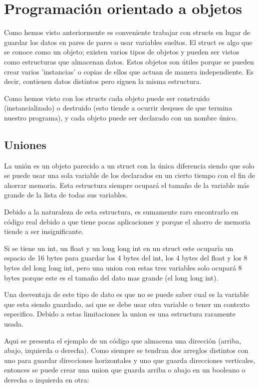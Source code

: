 \documentclass{article}
\begin{document}
\section{Programación orientado a objetos}

Como hemos visto anteriormente es conveniente trabajar con structs en lugar de guardar los datos en pares de pares o usar variables sueltos. El struct es algo que se conoce como un objeto; existen varios tipos de objetos y pueden ser vistos como estructuras que almacenan datos. Estos objetos son útiles porque se pueden crear varios 'instancias' o copias de ellos que actuan de manera independiente. Es decir, contienen datos distintos pero siguen la misma estructura.

Como hemos visto con los structs cada objeto puede ser construido (instancializado) o destruido (esto tiende a ocurrir despues de que termina nuestro programa), y cada objeto puede ser declarado con un nombre único.

\subsection{Uniones}

La unión es un objeto parecido a un struct con la única diferencia siendo que solo se puede usar una sola variable de los declarados en un cierto tiempo con el fin de ahorrar memoria. Esta estructura siempre ocupará el tamaño de la variable más grande de la lista de todas sus variables.

Debido a la naturaleza de esta estructura, es sumamente raro encontrarlo en código real debido a que tiene pocas aplicaciones y porque el ahorro de memoria tiende a ser insignificante.

Si se tiene un int, un float y un long long int en un struct este ocuparía un espacio de 16 bytes para guardar los 4 bytes del int, los 4 bytes del float y los 8 bytes del long long int, pero una union con estas tres variables solo ocupará 8 bytes porque este es el tamaño del dato mas grande (el long long int).

Una desventaja de este tipo de dato es que no se puede saber cual es la variable que esta siendo guardado, asi que se debe usar otra variable o tener un contexto especifico. Debido a estas limitaciones la union es una estructura raramente usada.

Aqui se presenta el ejemplo de un código que almacena una dirección (arriba, abajo, izquierda o derecha). Como siempre se tendran dos arreglos distintos con uno para guardar direcciones horizontales y uno que guarda direcciones verticales, entonces se puede crear una union que guarda arriba o abajo en un booleano o derecha o izquierda en otra:
\end{document}
